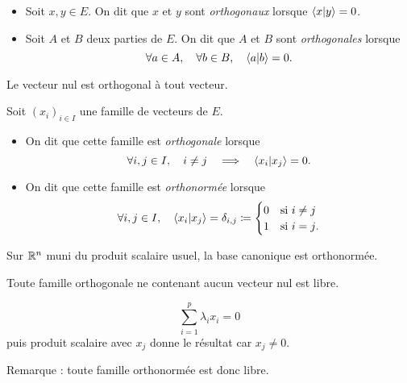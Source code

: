 \documentclass{magnolia}
\begin{document}
\begin{definition}[utile=-3]
$\quad$
\begin{itemize}
\item Soit $x,y\in E$. On dit que $x$ et $y$ sont \emph{orthogonaux} lorsque
  $\left\langle {x}\middle|{y}\right\rangle=0$.
\item Soit $A$ et $B$ deux parties de $E$. On dit que $A$ et $B$ sont
  \emph{orthogonales} lorsque
  \[\forall a\in A ,\quad \forall b\in B ,\quad \left\langle {a}\middle|{b}\right\rangle=0.\]
\end{itemize}
\end{definition}

\begin{remarqueUnique}
\remarque Le vecteur nul est orthogonal à tout vecteur.
\end{remarqueUnique}

\begin{definition}[utile=-3]
Soit $(x_i)_{i\in I}$ une famille de vecteurs de $E$.
\begin{itemize}
\item On dit que cette famille est \emph{orthogonale} lorsque
  \[\forall i,j\in I ,\quad i\neq j \quad\Longrightarrow\quad \left\langle {x_i}\middle|{x_j}\right\rangle=0.\]
\item On dit que cette famille est \emph{orthonormée} lorsque
  \[\forall i,j\in I ,\quad \left\langle {x_i}\middle|{x_j}\right\rangle=\delta_{i,j}\coloneqq
  \begin{cases}
  0 & \text{si $i\neq j$}\\
  1 & \text{si $i=j$.}
  \end{cases}\]
\end{itemize}
\end{definition}

\begin{remarqueUnique}
\remarque Sur $\mathbb{R}^n$ muni du produit scalaire usuel, la base canonique est
  orthonormée.
\end{remarqueUnique}

\begin{proposition}[utile=-3]
Toute famille orthogonale ne contenant aucun vecteur nul est libre.
\end{proposition}

\begin{preuve}
$$\sum_{i=1}^p\lambda_i x_i=0$$ puis produit scalaire avec $x_j$ donne le résultat car $x_j\neq 0$.
\end{preuve}

\begin{sol}
Remarque : toute famille orthonormée est donc libre.
\end{sol}
\end{document}

